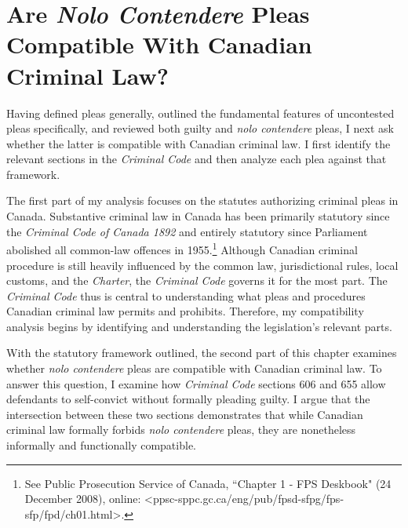 \chapter{Are \textit{Nolo Contendere} Pleas Compatible With Canadian Criminal Law?}

\setcounter{footnote}{116}

Having defined pleas generally, outlined the fundamental features of uncontested pleas specifically, and reviewed both guilty and \textit{nolo contendere} pleas, I next ask whether the latter is compatible with Canadian criminal law. I first identify the relevant sections in the \textit{Criminal Code} and then analyze each plea against that framework. 

The first part of my analysis focuses on the statutes authorizing criminal pleas in Canada. Substantive criminal law in Canada has been primarily statutory since the \textit{Criminal Code of Canada 1892} and entirely statutory since Parliament abolished all common-law offences in 1955.\footnote{See Public Prosecution Service of Canada, ``Chapter 1 - FPS Deskbook" (24 December 2008), online: \textless ppsc-sppc.gc.ca/eng/pub/fpsd-sfpg/fps-sfp/fpd/ch01.html\textgreater.} Although Canadian criminal procedure is still heavily influenced by the common law, jurisdictional rules, local customs, and the \textit{Charter}, the \textit{Criminal Code} governs it for the most part. The \textit{Criminal Code} thus is central to understanding what pleas and procedures Canadian criminal law permits and prohibits. Therefore, my compatibility analysis begins by identifying and understanding the legislation's relevant parts. 

With the statutory framework outlined, the second part of this chapter examines whether \textit{nolo contendere} pleas are compatible with Canadian criminal law. To answer this question, I examine how \textit{Criminal Code} sections 606 and 655 allow defendants to self-convict without formally pleading guilty. I argue that the intersection between these two sections demonstrates that while Canadian criminal law formally forbids \textit{nolo contendere} pleas, they are nonetheless informally and functionally compatible.